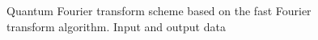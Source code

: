 \begin{figure}
\centering



\caption{Quantum Fourier transform scheme based on the fast Fourier transform algorithm. Input and output data}
\label{figQuantCompQuantFourier0}
\end{figure}
